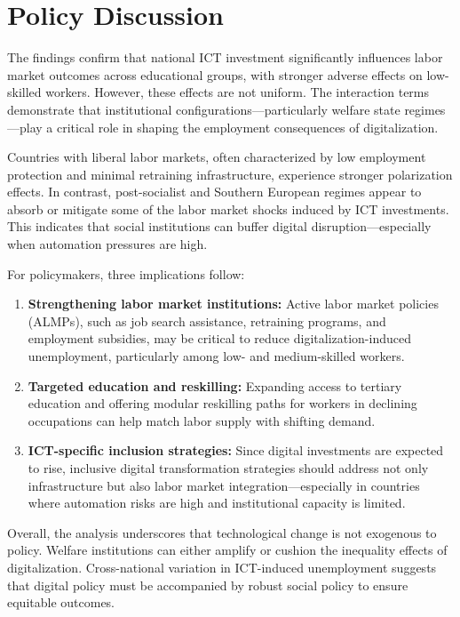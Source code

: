 
\section{Policy Discussion}

The findings confirm that national ICT investment significantly influences labor market outcomes 
across educational groups, with stronger adverse effects on low-skilled workers. However, these 
effects are not uniform. The interaction terms demonstrate that institutional 
configurations—particularly welfare state regimes—play a critical role in shaping the employment 
consequences of digitalization.

Countries with liberal labor markets, often characterized by low employment protection and minimal 
retraining infrastructure, experience stronger polarization effects. In contrast, post-socialist and 
Southern European regimes appear to absorb or mitigate some of the labor market shocks induced by ICT 
investments. This indicates that social institutions can buffer digital disruption—especially when 
automation pressures are high.

For policymakers, three implications follow:

\begin{enumerate}
    \item \textbf{Strengthening labor market institutions:} Active labor market policies (ALMPs), 
    such as job search assistance, retraining programs, and employment subsidies, may be critical to 
    reduce digitalization-induced unemployment, particularly among low- and medium-skilled workers.
    
    \item \textbf{Targeted education and reskilling:} Expanding access to tertiary education and 
    offering modular reskilling paths for workers in declining occupations can help match labor 
    supply with shifting demand.
    
    \item \textbf{ICT-specific inclusion strategies:} Since digital investments are expected to rise, 
    inclusive digital transformation strategies should address not only infrastructure but also labor 
    market integration—especially in countries where automation risks are high and institutional 
    capacity is limited.
\end{enumerate}

Overall, the analysis underscores that technological change is not exogenous to policy. Welfare 
institutions can either amplify or cushion the inequality effects of digitalization. Cross-national 
variation in ICT-induced unemployment suggests that digital policy must be accompanied by robust 
social policy to ensure equitable outcomes.
